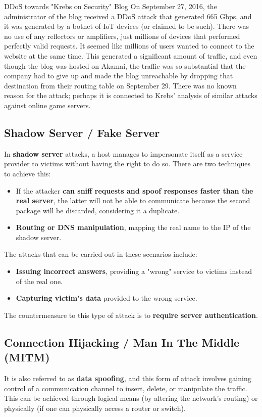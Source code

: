 \begin{casehistory}{{DDoS towards "Krebs on Security" Blog}}
	On September 27, 2016, the administrator of the blog received a DDoS attack that generated 665 Gbps, and it was generated by a botnet of IoT devices (or claimed to be such).
	There was no use of any reflectors or amplifiers, just millions of devices that performed perfectly valid requests.
	It seemed like millions of users wanted to connect to the website at the same time. This generated a significant amount of traffic, and even though the blog was hosted on Akamai, the traffic was so substantial that the company had to give up and made the blog unreachable by dropping that destination from their routing table on September 29.
	There was no known reason for the attack; perhaps it is connected to Krebs' analysis of similar attacks against online game servers.
\end{casehistory}


\subsection{Shadow Server / Fake Server}
In \textbf{shadow server} attacks, a host manages to impersonate itself as a service provider to victims without having the right to do so. There are two techniques to achieve this:
\begin{itemize}
	\item If the attacker \textbf{can sniff requests and spoof responses faster than the real server}, the latter will not be able to communicate because the second package will be discarded, considering it a duplicate.
	\item \textbf{Routing or DNS manipulation}, mapping the real name to the IP of the shadow server.
\end{itemize}

The attacks that can be carried out in these scenarios include:
\begin{itemize}
	\item \textbf{Issuing incorrect answers}, providing a "wrong" service to victims instead of the real one.
	\item \textbf{Capturing victim's data} provided to the wrong service.
\end{itemize}
The countermeasure to this type of attack is to \textbf{require server authentication}.


\subsection{Connection Hijacking / Man In The Middle (MITM)}
It is also referred to as \textbf{data spoofing}, and this form of attack involves gaining control of a communication channel to insert, delete, or manipulate the traffic. This can be achieved through logical means (by altering the network's routing) or physically (if one can physically access a router or switch).

